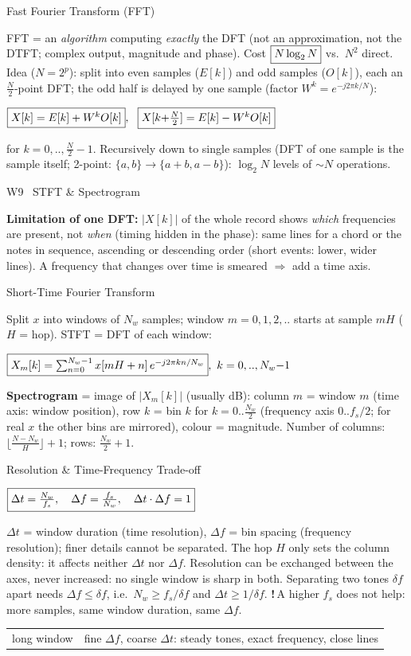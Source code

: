\documentclass[a4paper,landscape]{article}
\newcommand{\sect}[1]{\par\vspace{1pt}\noindent\colorbox{secblue}{\parbox{\dimexpr\linewidth-2\fboxsep}{\color{white}\bfseries\fontsize{6.8}{7.6}\selectfont\strut #1}}\par\vspace{0.4pt}}
\newcommand{\sub}[1]{\par\vspace{0.6pt}\noindent\colorbox{subblue}{\parbox{\dimexpr\linewidth-2\fboxsep}{\bfseries\strut #1}}\par\vspace{0.2pt}}
\newcommand{\warn}[1]{{\color{warnred}\textbf{!}\,#1}}
\newcommand{\bx}[1]{\fbox{$\textstyle #1$}}
\newcommand{\eqc}[1]{\par\vspace{0.2pt}\centerline{$#1$}\par\vspace{0.2pt}}
\begin{document}
\begin{multicols*}{4}
\sub{Fast Fourier Transform (FFT)}
FFT = an \emph{algorithm} computing \emph{exactly} the DFT (not an approximation, not the DTFT; complex output, magnitude and phase). Cost $\bx{N\log_2N}$ vs.\ $N^2$ direct. Idea ($N=2^p$): split into even samples ($E[k]$) and odd samples ($O[k]$), each an $\frac N2$-point DFT; the odd half is delayed by one sample (factor $W^k=e^{-j2\pi k/N}$):
\eqc{\bx{X[k]=E[k]+W^kO[k]},\ \ \bx{X[k{+}\tfrac N2]=E[k]-W^kO[k]}}
for $k=0,..,\frac N2{-}1$.
Recursively down to single samples (DFT of one sample is the sample itself; 2-point: $\{a,b\}\to\{a{+}b,a{-}b\}$): $\log_2N$ levels of $\sim N$ operations.

\sect{W9 \ STFT \& Spectrogram}
\textbf{Limitation of one DFT:} $|X[k]|$ of the whole record shows \emph{which} frequencies are present, not \emph{when} (timing hidden in the phase): same lines for a chord or the notes in sequence, ascending or descending order (short events: lower, wider lines). A frequency that changes over time is smeared $\Rightarrow$ add a time axis.
\sub{Short-Time Fourier Transform}
Split $x$ into windows of $N_w$ samples; window $m=0,1,2,..$ starts at sample $mH$ ($H$ = hop). STFT = DFT of each window:
\eqc{\bx{X_m[k]=\textstyle\sum_{n=0}^{N_w-1}x[mH+n]\,e^{-j2\pi kn/N_w}},\ k=0,..,N_w{-}1}
\textbf{Spectrogram} = image of $|X_m[k]|$ (usually dB): column $m$ = window $m$ (time axis: window position), row $k$ = bin $k$ for $k=0..\frac{N_w}2$ (frequency axis $0..f_s/2$; for real $x$ the other bins are mirrored), colour = magnitude.
Number of columns: $\lfloor\frac{N-N_w}H\rfloor+1$; rows: $\frac{N_w}2+1$.
\sub{Resolution \& Time-Frequency Trade-off}
\eqc{\bx{\Delta t=\frac{N_w}{f_s},\quad\Delta f=\frac{f_s}{N_w},\quad\Delta t\cdot\Delta f=1}}
$\Delta t$ = window duration (time resolution), $\Delta f$ = bin spacing (frequency resolution); finer details cannot be separated. The hop $H$ only sets the column density: it affects neither $\Delta t$ nor $\Delta f$. Resolution can be exchanged between the axes, never increased: no single window is sharp in both.
Separating two tones $\delta f$ apart needs $\Delta f\le\delta f$, i.e.\ $N_w\ge f_s/\delta f$ and $\Delta t\ge1/\delta f$. \warn{A higher $f_s$ does not help: more samples, same window duration, same $\Delta f$.}\\
\begin{tabularx}{\linewidth}{@{}lY@{}}
long window & fine $\Delta f$, coarse $\Delta t$: steady tones, exact frequency, close lines\\

\end{tabularx}
\end{multicols*}
\end{document}
